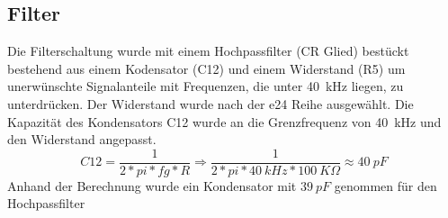 \subsection{Filter}%
Die Filterschaltung wurde mit einem Hochpassfilter (CR Glied) bestückt bestehend aus einem Kodensator (C12) und einem Widerstand (R5) um unerwünschte Signalanteile mit Frequenzen, die unter 40~kHz liegen, zu unterdrücken. Der Widerstand wurde nach der e24 Reihe ausgewählt.
Die Kapazität des Kondensators C12 wurde an die Grenzfrequenz von 40~kHz und den Widerstand angepasst.
\onehalfspacing \\
\[\displaystyle C12=\frac{1}{2*pi*fg*R}\Rightarrow\frac{1}{2*pi*40~kHz*100~K\Omega}\approx40~pF \]
\singlespacing
Anhand der Berechnung wurde ein Kondensator mit \(\displaystyle 39~pF\) genommen für den Hochpassfilter

